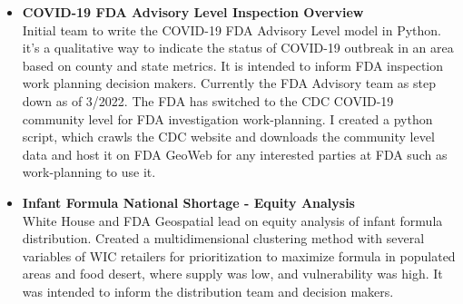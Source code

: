 \documentclass[letterpaper]{twentysecondcv} %
\begin{document}
      \begin{twenty}
 \twentyitem
    
    
        {}        
        {}
        {
        {\begin{itemize}
        
   \item \textbf{COVID-19 FDA Advisory Level Inspection Overview }\\
Initial team to write the COVID-19 FDA Advisory Level model in Python. it’s a qualitative way to indicate the status of COVID-19 outbreak in an area based on county and state metrics. It is intended to inform FDA inspection work planning decision makers. Currently the FDA Advisory team as step down as of 3/2022. The FDA has switched to the CDC COVID-19 community level for FDA investigation work-planning. I created a python script, which crawls the CDC website and downloads the community level data and host it on FDA GeoWeb for any interested parties at FDA such as work-planning to use it.
   \item \textbf{Infant Formula National Shortage - Equity Analysis}\\
White House and  FDA Geospatial lead on equity analysis of infant formula distribution. Created a multidimensional clustering method with several variables of WIC retailers for prioritization to maximize formula in populated areas and food desert, where supply was low, and vulnerability was high.  It was intended to inform the distribution team and decision makers.
          \end{itemize}}
        }
    \\
     \end{twenty}      
      
\end{document}
